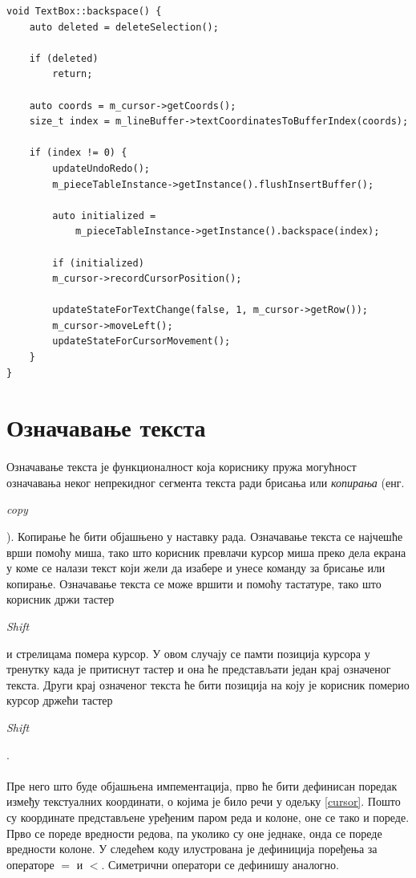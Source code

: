 \documentclass[12pt,oneside]{memoir}
\begin{document}
\begin{verbatim}
void TextBox::backspace() {
	auto deleted = deleteSelection();
	
	if (deleted)
		return;
	
	auto coords = m_cursor->getCoords();
	size_t index = m_lineBuffer->textCoordinatesToBufferIndex(coords);
	
	if (index != 0) {
		updateUndoRedo();
		m_pieceTableInstance->getInstance().flushInsertBuffer();
		
		auto initialized = 
			m_pieceTableInstance->getInstance().backspace(index);
		
		if (initialized)
		m_cursor->recordCursorPosition();
		
		updateStateForTextChange(false, 1, m_cursor->getRow());
		m_cursor->moveLeft();
		updateStateForCursorMovement();
	}
}
\end{verbatim}

\section{Означавање текста}
\paragraph{}
Означавање текста је функционалност која кориснику пружа могућност означавања
неког непрекидног сегмента текста ради брисања или \emph{копирања}
(енг. \begin{latinica}\textit{copy}\end{latinica}). Копирање ће бити
објашњено у наставку рада. Означавање текста се најчешће врши помоћу миша, тако што корисник превлачи курсор миша преко дела екрана у коме се налази текст који жели да изабере
и унесе команду за брисање или копирање. Означавање текста се може вршити и помоћу тастатуре,
тако што корисник држи тастер \begin{latinica}\textit{Shift}\end{latinica} и стрелицама
помера курсор. У овом случају се памти позиција курсора у тренутку када је притиснут тастер 
и она ће представљати један крај означеног текста. Други крај означеног текста ће бити позиција на коју је корисник померио курсор држећи тастер
\begin{latinica}\textit{Shift}\end{latinica}.

\paragraph{}
Пре него што буде објашњена импементација, прво ће бити дефинисан поредак између текстуалних координати, о којима је било речи у одељку \ref{cursor}. Пошто су координате
представљене уређеним паром реда и колоне,  оне се тако и пореде. Прво се пореде вредности редова, па уколико су оне једнаке, онда се пореде вредности колоне. У следећем коду
илустрована је дефиниција поређења за операторе \(=\) и \(<\). Симетрични оператори се дефинишу аналогно.
\end{document}
